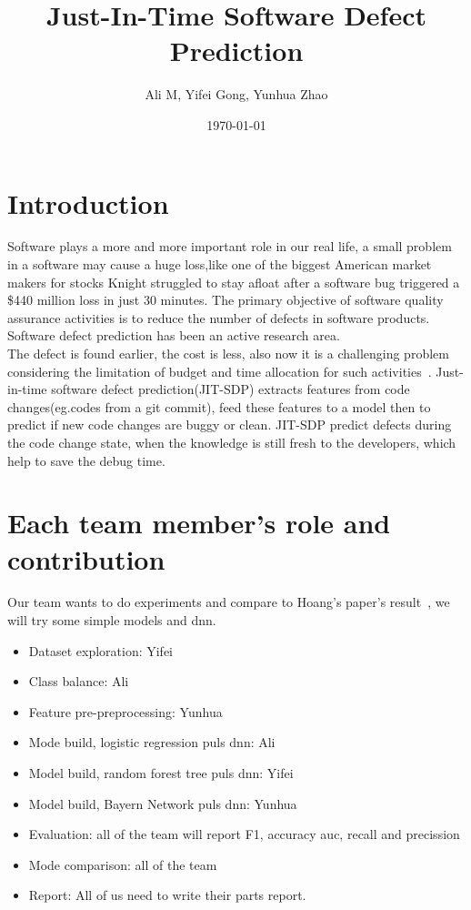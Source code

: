 \documentclass{article}
\title{Just-In-Time Software Defect Prediction}
\author{Ali M, Yifei Gong, Yunhua Zhao}
\date{\today}
\begin{document}
\maketitle

\section{Introduction}
Software plays a more and more important role in our real life, a small problem in a software may cause a huge loss,like one of the biggest American market makers for stocks Knight struggled to stay afloat after a software bug triggered a \$440 million loss in just 30 minutes. The primary objective of software quality assurance activities is to reduce the number of defects in software products. Software defect prediction has been an active research area. \\
The defect is found earlier, the cost is less, also now it is a challenging problem considering the limitation of budget and time allocation for such activities~\cite{wan2018perceptions}. Just-in-time software defect prediction(JIT-SDP) extracts features from code changes(eg.codes from a git commit), feed these features to a model then to predict if new code changes are buggy or clean. JIT-SDP predict defects during the code change state, when the knowledge is still fresh to the developers, which help to save the debug time.

\section{Each team member’s role and contribution}
Our team wants to do experiments and compare to Hoang's paper's result~\cite{hoang2019deepjit}, we will try some simple models and dnn.\\
\begin{itemize}
	\item Dataset exploration: Yifei 
	\item Class balance: Ali
	\item Feature pre-preprocessing: Yunhua
	\item Mode build, logistic regression puls dnn: Ali
	\item Model build, random forest tree puls dnn: Yifei
	\item Model build, Bayern Network puls dnn: Yunhua
	\item Evaluation: all of the team will report F1, accuracy auc, recall and precission
	\item Mode comparison: all of the team
	\item Report: All of us need to write their parts report.
\end{itemize}
\end{document}

